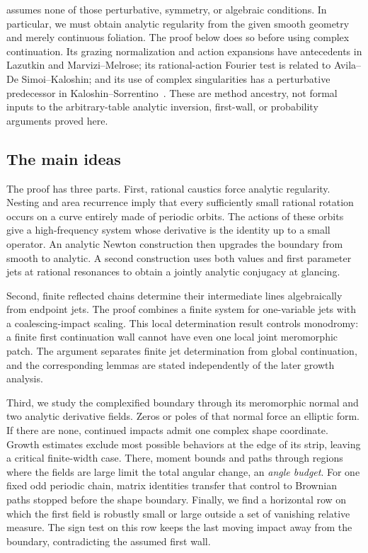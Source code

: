  assumes none of those perturbative, symmetry, or algebraic
conditions. In particular, we must obtain analytic regularity from the
given smooth geometry and merely continuous foliation. The proof below
does so before using complex continuation. Its grazing normalization
and action expansions have antecedents in Lazutkin and Marvizi--Melrose;
its rational-action Fourier test is related to Avila--De Simoi--Kaloshin;
and its use of complex singularities has a perturbative predecessor in
Kaloshin--Sorrentino~\cite{Lazutkin1973,MM1982,ADK2016,KS2018}.
These are method ancestry, not formal inputs to the arbitrary-table
analytic inversion, first-wall, or probability arguments proved here.

\subsection{The main ideas}

The proof has three parts. First, rational caustics force analytic
regularity. Nesting and area recurrence imply that every sufficiently
small rational rotation occurs on a curve entirely made of periodic
orbits. The actions of these orbits give a high-frequency system whose
derivative is the identity up to a small operator. An analytic Newton
construction then upgrades the boundary from smooth to analytic.
A second construction uses both values and first parameter jets at
rational resonances to obtain a jointly analytic conjugacy at glancing.

Second, finite reflected chains determine their intermediate lines
algebraically from endpoint jets. The proof combines a finite system
for one-variable jets with a coalescing-impact scaling. This local
determination result controls monodromy: a finite first continuation
wall cannot have even one local joint meromorphic patch. The argument
separates finite jet determination from global continuation, and the
corresponding lemmas are stated independently of the later growth
analysis.

Third, we study the complexified boundary through its meromorphic
normal and two analytic derivative fields. Zeros or poles of that
normal force an elliptic form. If there are none, continued impacts
admit one complex shape coordinate. Growth estimates exclude most
possible behaviors at the edge of its strip, leaving a critical
finite-width case. There, moment bounds and paths through regions
where the fields are large limit the total angular change, an
\emph{angle budget}. For one fixed odd periodic chain, matrix identities
transfer that control to Brownian paths stopped before the shape
boundary. Finally, we find a horizontal row on which the first field is
robustly small or large outside a set of vanishing relative measure.
The sign test on this row keeps the last moving impact away from the
boundary, contradicting the assumed first wall.

